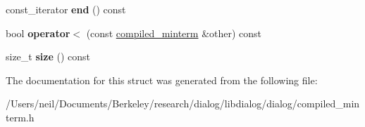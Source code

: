 \begin{DoxyCompactItemize}
\mbox{\label{structdialog_1_1compiled__minterm_a87ceaaaa066ba37c9011ce8c2528df05}} 
const\+\_\+iterator {\bfseries end} () const
\item 
\mbox{\label{structdialog_1_1compiled__minterm_a3372a6038c5355f380777819a7c20ac7}} 
bool {\bfseries operator$<$} (const \hyperlink{structdialog_1_1compiled__minterm}{compiled\+\_\+minterm} \&other) const
\item 
\mbox{\label{structdialog_1_1compiled__minterm_abd22f6677acd5ec7918653ba8bbd2692}} 
size\+\_\+t {\bfseries size} () const
\end{DoxyCompactItemize}


The documentation for this struct was generated from the following file\+:\begin{DoxyCompactItemize}
\item 
/\+Users/neil/\+Documents/\+Berkeley/research/dialog/libdialog/dialog/compiled\+\_\+minterm.\+h\end{DoxyCompactItemize}
